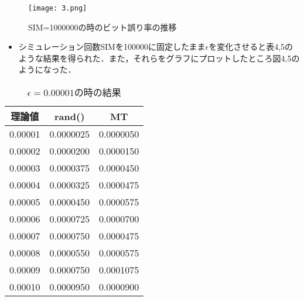 \documentclass[12pt]{jarticle}
\begin{document}
\begin{figure}[H]
    \begin{center}
        \texttt{[image: 3.png]}
    \end{center}
    \caption{SIM=1000000の時のビット誤り率の推移}
    \label{fig1}
\end{figure}
\begin{itemize}
    \item シミュレーション回数SIMを100000に固定したまま$\epsilon$を変化させると表4,5のような結果を得られた．また，それらをグラフにプロットしたところ図4,5のようになった．
\end{itemize}
\begin{table}[h]
    \begin{minipage}{0.5\hsize}
        \begin{center}
            \caption{$\epsilon=0.00001$の時の結果}
            \begin{tabular}{|r|r|r|} \hline
                \multicolumn{1}{|c|}{理論値} & \multicolumn{1}{|c|}{rand()} & \multicolumn{1}{|c|}{MT} \\\hline
                0.00001                      & 0.0000025                    & 0.0000050                \\\hline
                0.00002                      & 0.0000200                    & 0.0000150                \\\hline
                0.00003                      & 0.0000375                    & 0.0000450                \\\hline
                0.00004                      & 0.0000325                    & 0.0000475                \\\hline
                0.00005                      & 0.0000450                    & 0.0000575                \\\hline
                0.00006                      & 0.0000725                    & 0.0000700                \\\hline
                0.00007                      & 0.0000750                    & 0.0000475                \\\hline
                0.00008                      & 0.0000550                    & 0.0000575                \\\hline
                0.00009                      & 0.0000750                    & 0.0001075                \\\hline
                0.00010                      & 0.0000950                    & 0.0000900                \\\hline

\end{tabular}
\end{center}
\end{minipage}
\end{table}
\end{document}
